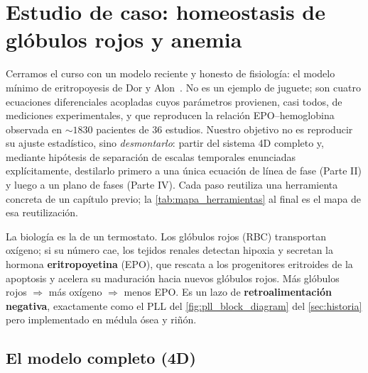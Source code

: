 \section{Estudio de caso: homeostasis de glóbulos rojos y anemia}

Cerramos el curso con un modelo reciente y honesto de fisiología: el modelo mínimo de eritropoyesis de Dor y Alon~\cite{dor2026}. No es un ejemplo de juguete; son cuatro ecuaciones diferenciales acopladas cuyos parámetros provienen, casi todos, de mediciones experimentales, y que reproducen la relación EPO--hemoglobina observada en $\sim 1830$ pacientes de $36$ estudios. Nuestro objetivo no es reproducir su ajuste estadístico, sino \emph{desmontarlo}: partir del sistema 4D completo y, mediante hipótesis de separación de escalas temporales enunciadas explícitamente, destilarlo primero a una única ecuación de línea de fase (Parte II) y luego a un plano de fases (Parte IV). Cada paso reutiliza una herramienta concreta de un capítulo previo; la \cref{tab:mapa_herramientas} al final es el mapa de esa reutilización.

La biología es la de un termostato. Los glóbulos rojos (RBC) transportan oxígeno; si su número cae, los tejidos renales detectan hipoxia y secretan la hormona \textbf{eritropoyetina} (EPO), que rescata a los progenitores eritroides de la apoptosis y acelera su maduración hacia nuevos glóbulos rojos. Más glóbulos rojos $\Rightarrow$ más oxígeno $\Rightarrow$ menos EPO. Es un lazo de \textbf{retroalimentación negativa}, exactamente como el PLL del \cref{fig:pll_block_diagram} del \cref{sec:historia} pero implementado en médula ósea y riñón.

\subsection{El modelo completo (4D)}
\label{sec:eritro_4d}

